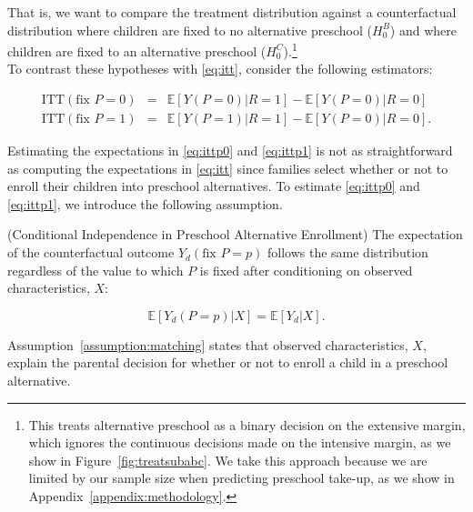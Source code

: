 \noindent That is, we want to compare the treatment distribution against a counterfactual distribution where children are fixed to no alternative preschool ($H_{0}^B$) and where children are fixed to an alternative preschool ($H_{0}^C$).\footnote{This treats alternative preschool as a binary decision on the extensive margin, which ignores the continuous decisions made on the intensive margin, as we show in Figure~\ref{fig:treatsubabc}. We take this approach because we are limited by our sample size when predicting preschool take-up, as we show in Appendix~\ref{appendix:methodology}.}\\

\noindent To contrast these hypotheses with \eqref{eq:itt}, consider the following estimators: 

\begin{eqnarray}
\text{ITT} \left( \text{fix } P = 0 \right) &=& \mathbb{E} \left[ Y \left( P = 0 \right)  | R = 1 \right] - \mathbb{E} \left[ Y \left( P = 0 \right) | R = 0 \right] \label{eq:ittp0} \\
\text{ITT} \left( \text{fix } P = 1 \right) &=& \mathbb{E} \left[ Y \left( P = 1 \right) | R = 1 \right] - \mathbb{E} \left[ Y \left( P = 0 \right) | R = 0 \right]. \label{eq:ittp1}  
\end{eqnarray}

\noindent Estimating the expectations in \eqref{eq:ittp0} and \eqref{eq:ittp1} is not as straightforward as computing the expectations in \eqref{eq:itt} since families select whether or not to enroll their children into preschool alternatives. To estimate \eqref{eq:ittp0} and \eqref{eq:ittp1}, we introduce the following assumption. \\

\begin{assumption} \normalfont \label{assumption:matching} (Conditional Independence in Preschool Alternative Enrollment) The expectation of the counterfactual outcome $Y_{d} \left( \text{fix } P=p \right)$ follows the same distribution regardless of the value to which $P$ is fixed after conditioning on observed characteristics, $X$:

\begin{equation}
\mathbb{E} \left [ Y_{d} \left( P = p \right) | X  \right] = \mathbb{E} \left [ Y_{d} | X  \right].
\end{equation}
 \end{assumption}

\noindent Assumption~\ref{assumption:matching} states that observed characteristics, $X$, explain the parental decision for whether or not to enroll a child in a preschool alternative.\\

